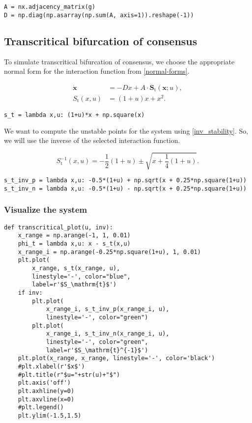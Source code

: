 \begin{verbatim}
A = nx.adjacency_matrix(g)
D = np.diag(np.asarray(np.sum(A, axis=1)).reshape(-1))
\end{verbatim}

\hypertarget{transcritical-bifurcation-of-consensus}{%
\subsection{Transcritical bifurcation of
consensus}\label{transcritical-bifurcation-of-consensus}}

To simulate transcritical bifurcation of consensus, we choose the
appropriate normal form for the interaction function from
\cref{normal-forms}.

\begin{equation}
\begin{aligned}
\dot{\mathbf{x}} &= -Dx + A\cdot \mathbf{S}_\mathrm{t}(\mathbf{x};u),\\
S_\mathrm{t}(x,u) &= (1+u)x + x^2 .
\end{aligned}
\end{equation}

\begin{verbatim}
s_t = lambda x,u: (1+u)*x + np.square(x)
\end{verbatim}

We want to compute the unstable points for the system using
\cref{inv_stability}. So, we will use the inverse of the selected
interaction function.

\begin{equation}
S_\mathrm{t}^{-1}(x,u) = -\frac{1}{2}(1+u) \pm \sqrt{x + \frac{1}{4}(1+u)}.
\end{equation}

\begin{verbatim}
s_t_inv_p = lambda x,u: -0.5*(1+u) + np.sqrt(x + 0.25*np.square(1+u))
s_t_inv_n = lambda x,u: -0.5*(1+u) - np.sqrt(x + 0.25*np.square(1+u))
\end{verbatim}

\hypertarget{visualize-the-system}{%
\subsubsection{Visualize the system}\label{visualize-the-system}}

\begin{verbatim}
def transcritical_plot(u, inv):
    x_range = np.arange(-1, 1, 0.01)
    phi_t = lambda x,u: x - s_t(x,u)
    x_range_i = np.arange(-0.25*np.square(1+u), 1, 0.01)
    plt.plot(
        x_range, s_t(x_range, u), 
        linestyle='-', color="blue", 
        label=r'$S_\mathrm{t}$')
    if inv:
        plt.plot(
            x_range_i, s_t_inv_p(x_range_i, u), 
            linestyle='-', color="green")
        plt.plot(
            x_range_i, s_t_inv_n(x_range_i, u), 
            linestyle='-', color="green", 
            label=r'$S_\mathrm{t}^{-1}$')
    plt.plot(x_range, x_range, linestyle='-', color='black')
    #plt.xlabel(r'$x$')
    #plt.title(r"$u="+str(u)+"$")
    plt.axis('off')
    plt.axhline(y=0)
    plt.axvline(x=0)
    #plt.legend()
    plt.ylim(-1.5,1.5)
\end{verbatim}

